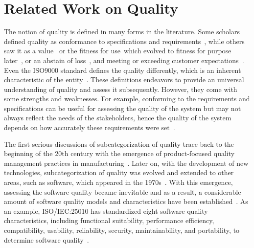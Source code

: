 \documentclass{llncs}
\begin{document}
    \section{Related Work on Quality}
    The notion of quality is defined in many forms in the literature. Some scholars defined quality as conformance to specifications and
    requirements~\cite{ProductConformanceCostGilmore,LevittTheodoreProduction-LineApproach,QualityisFree}, while others saw it as a value~\cite{QualityandCompetitionanEssayinEconomicTheory} or the 
    fitness for use~\cite{Juran1974}which evolved to fitness for purpose later~\cite{Juran2010},  
    or an abstain of loss~\cite{GenichiTaguchi}, and meeting or exceeding customer expectations~\cite{Groenrossstrategicmanagementandmarketing}. 
    Even the ISO9000 standard defines the quality differently, which is an inherent characteristic of the entity~\cite{ISO9000}. 
    These definitions endeavors to provide an universal understanding of quality and assess it subsequently. However, 
    they come with some strengths and weaknesses. For example, conforming to the requirements and specifications can be useful for assessing the quality of the system but may not always reflect the needs of the stakeholders,
    hence the quality of the system depends on how accurately these requirements were set~\cite{IEE7302014}. 
    
    The first serious discussions of subcategorization of quality trace back to the beginning of the 20th century with the emergence of product-focused quality management practices in manufacturing~\cite{HistoryofControlEngineering}.
    Later on, with the development of new technologies, subcategorization of quality was evolved and extended to other areas, such as software, which appeared in the 1970s~\cite{ThePsychologyofComputerProgramming}.
    With this emergence, assessing the software quality became inevitable and as a result, a considerable amount of software quality models and characteristics have been established~\cite{SoftwareQualityModels,Charecteristicsofsoftwarequality,AnActivityBasedQualityModelforMaintainability}.
    As an example, ISO/IEC:25010 has standardized eight software quality characteristics, including functional suitability, performance efficiency, compatibility, usability, reliability, security, maintainability, 
    and portability, to determine software quality~\cite{ISO/IEC:25010}.
    
\end{document}
